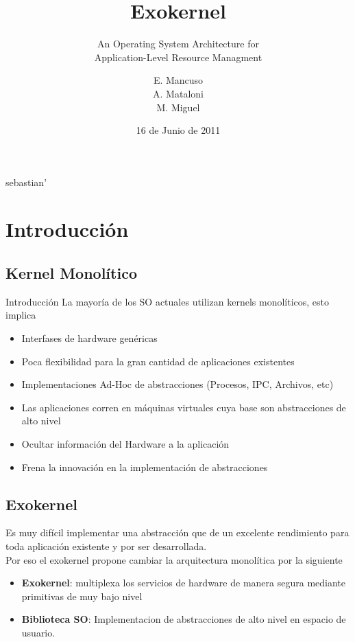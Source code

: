 sebastian'\]\documentclass[10pt]{beamer}
\title{Exokernel}
\subtitle{An Operating System Architecture for \\  Application-Level Resource Managment}
\author{E. Mancuso\\ A. Mataloni\\ M. Miguel }
\date{16 de Junio de 2011}
\begin{document}
 \begin{frame}
  \titlepage
 \end{frame}
 \begin{frame}
  \tableofcontents
 \end{frame}
\section{Introducción}
\subsection{Kernel Monolítico}
\begin{frame}{Introducción}
La mayoría de los SO actuales utilizan kernels monolíticos, esto implica

\begin{itemize}
  \item Interfases de hardware genéricas
  \item Poca flexibilidad para la gran cantidad de aplicaciones existentes
  \item Implementaciones Ad-Hoc de abstracciones (Procesos, IPC, Archivos, etc)
  \item Las aplicaciones corren en máquinas virtuales cuya base son abstracciones de alto nivel
  \item Ocultar información del Hardware a la aplicación
  \item Frena la innovación en la implementación de abstracciones
\end{itemize}
\end{frame}

\subsection{Exokernel}
\begin{frame}

Es muy difícil implementar una abstracción que de un excelente rendimiento para toda aplicación existente y por ser desarrollada.\\[1em]

Por eso el exokernel propone cambiar la arquitectura monolítica por la siguiente \\[1em]

\begin{itemize}
  \item \textbf{Exokernel}: multiplexa los servicios de hardware de manera segura mediante primitivas de muy bajo nivel
  \item \textbf{Biblioteca SO}: Implementacion de abstracciones de alto nivel en espacio de usuario.
\end{itemize}
\end{frame}
\end{document}
